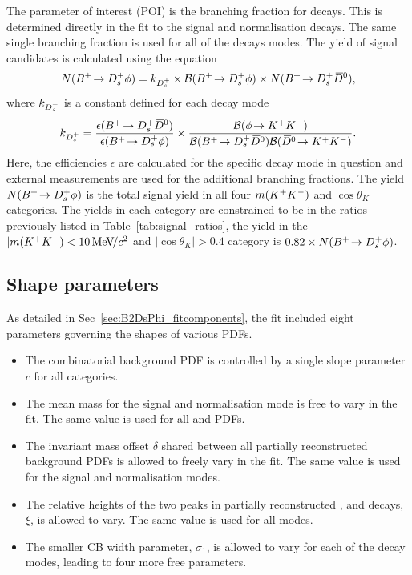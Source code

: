 The parameter of interest (POI) is the branching fraction for \decay{\Bp}{\Dsp\phiz} decays. This is determined directly in the fit to the signal and normalisation decays. The same single branching fraction is used for all of the \Dsp decays modes.
The yield of signal candidates is calculated using the equation 
\begin{equation}
N({{{B}^+}}\!\rightarrow {\ensuremath{{D}^+_{s}}}\phi) = k_{{{D}^+_{s}}} \times {\ensuremath{\mathcal{B}}}({{{B}^+}}\!\rightarrow {\ensuremath{{D}^+_{s}}}\phi) \times N({{{B}^+}}\!\rightarrow {\ensuremath{{D}^+_{s}}}{\ensuremath{{\kern 0.2em\overline{\kern -0.2em D}{}}{}^0}}),
\end{equation}
where $k_{{{D}^+_{s}}}$ is a constant defined for each \Dsp decay mode
\begin{equation}
k_{{{D}^+_{s}}} = \frac{\epsilon({{{B}^+}}\!\rightarrow {\ensuremath{{D}^+_{s}}}{\ensuremath{{\kern 0.2em\overline{\kern -0.2em D}{}}{}^0}})}{\epsilon({{{B}^+}}\!\rightarrow {\ensuremath{{D}^+_{s}}}\phi)} \times  \frac{{\mathcal{B}}(\phi\!\rightarrow {\ensuremath{{K}^+}}{\ensuremath{{K}^-}})}{{\mathcal{B}}({{{B}^+}}\!\rightarrow {\ensuremath{{D}^+_{s}}}{\ensuremath{{\kern 0.2em\overline{\kern -0.2em D}{}}{}^0}}){\mathcal{B}}({{\kern 0.2em\overline{\kern -0.2em D}{}}{}^0}\!\rightarrow {\ensuremath{{K}^+}}{\ensuremath{{K}^-}})}.
\end{equation}
Here, the efficiencies $\epsilon$ are calculated for the specific \Dsp decay mode in question and external measurements are used for the additional branching fractions.
The yield $N({{{B}^+}}\!\rightarrow {\ensuremath{{D}^+_{s}}}\phi)$ is the total signal yield in all four $m({{K}^+}{{K}^-})$ and $\cos\theta_{K}$ categories. The yields in each category are constrained to be in the ratios previously listed in Table~\ref{tab:signal_ratios}, \ie the yield in the $|m({{K}^+}{{K}^-})<10{\mathrm{\,Me\kern -0.1em V\!/}c^2}$ and $|\cos\theta_{K}|>0.4$ category is $0.82\times N({{{B}^+}}\!\rightarrow {\ensuremath{{D}^+_{s}}}\phi)$.



\subsection{Shape parameters}
As detailed in Sec~\ref{sec:B2DsPhi_fitcomponents}, the fit included eight parameters governing the shapes of various PDFs.
\begin{itemize}
\item The combinatorial background PDF is controlled by a single slope parameter $c$ for all categories.
\item The mean \Bp mass for the signal and normalisation mode is free to vary in the fit. The same value is used for all \decay{\Bp}{\Dsp\phiz} and \decay{\Bp}{\Dsp\Dzb} PDFs.
\item The invariant mass offset $\delta$ shared between all partially reconstructed background PDFs is allowed to freely vary in the fit. The same value is used for the signal and normalisation modes.
\item The relative heights of the two peaks in partially reconstructed \decay{\Bp}{\Dssp\phiz}, \decay{\Bp}{\Dssp\Dzb} and \decay{\Bp}{\Dsp\Dstarzb} decays, $\xi$, is allowed to vary. The same value is used for all modes.
\item The smaller CB width parameter, $\sigma_{1}$, is allowed to vary for each of the \Dsp decay modes, leading to four more free parameters. 
\end{itemize}

